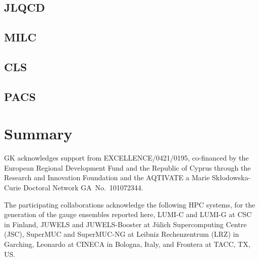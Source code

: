\documentclass[a4paper,11pt]{article}
\begin{document}
\subsection{JLQCD}

\subsection{MILC}

\subsection{CLS}

\subsection{PACS}

\section{Summary}

\acknowledgments GK acknowledges support from EXCELLENCE/0421/0195,
co-financed by the European Regional Development Fund and the Republic
of Cyprus through the Research and Innovation Foundation and the
AQTIVATE a Marie Sk\l{}odowska-Curie Doctoral Network
GA~No.~101072344.

The participating collaborations acknowledge the following HPC
systems, for the generation of the gauge ensembles reported here,
LUMI-C and LUMI-G at CSC in Finland, JUWELS and JUWELS-Booster at
Jülich Supercomputing Centre (JSC), SuperMUC and SuperMUC-NG at
Leibniz Rechenzentrum (LRZ) in Garching, Leonardo at CINECA in
Bologna, Italy, and Frontera at TACC, TX, US.





\end{document}
